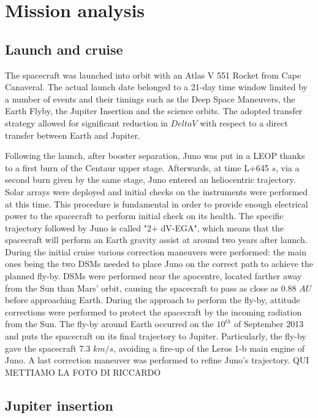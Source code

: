 \section{Mission analysis}
\label{sec:mission_analysis}

\subsection{Launch and cruise}
\label{sec: lancio e crociera}

The spacecraft was launched into orbit with an Atlas V 551 Rocket from Cape Canaveral. The actual launch date belonged to a 21-day time window limited by a number of events and their timings such as the Deep Space Maneuvers, the Earth Flyby, the Jupiter Insertion and the science orbits. The adopted transfer strategy allowed for significant reduction in $Delta V$ with respect to a direct transfer between Earth and Jupiter.

Following the launch, after booster separation, Juno was put in a LEOP thanks to a first burn of the Centaur upper stage. Afterwards, at time L+645 $s$, via a second burn given by the same stage, Juno entered an heliocentric trajectory. Solar arrays were deployed and initial checks on the instruments were performed at this time.  This procedure is fundamental in order to provide enough electrical power to the spacecraft to perform initial check on its health. 
The specific trajectory followed by Juno is called "2+ dV-EGA", which means that the spacecraft will perform an Earth gravity assist at around two years after launch.
During the initial cruise various correction maneuvers were performed: the main ones being the two DSMs needed to place Juno on the correct path to achieve the planned fly-by. 
DSMs were performed near the apocentre, located farther away from the Sun than Mars' orbit, causing the spacecraft to pass as close as 0.88 $AU$ before approaching Earth.  During the approach to perform the fly-by, attitude corrections were performed to protect the spacecraft by the incoming radiation from the Sun. 
The fly-by around Earth occurred on the $10^{th}$ of September 2013 and puts the spacecraft on its final trajectory to Jupiter. Particularly, the fly-by gave the spacecraft 7.3 $km/s$, avoiding a fire-up of the Leros 1-b main engine of Juno. A last correction maneuver was performed to refine Juno's trajectory.  QUI METTIAMO LA FOTO DI RICCARDO 

\subsection{Jupiter insertion}
\label{sec: joi}

